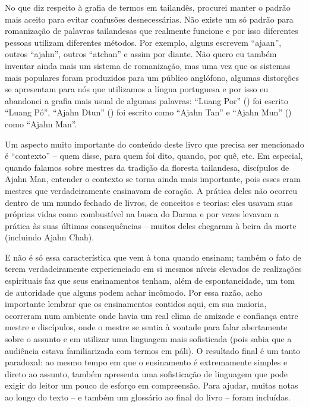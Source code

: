 No que diz respeito à grafia de termos em tailandês, procurei manter
o padrão mais aceito para evitar confusões desnecessárias. Não existe
um só padrão para romanização de palavras tailandesas que realmente
funcione e por isso diferentes pessoas utilizam diferentes métodos. Por
exemplo, alguns escrevem “ajaan”, outros “ajahn”, outros “atchan” e
assim por diante. Não quero eu também inventar ainda mais um sistema de
romanização, mas uma vez que os sistemas mais populares foram
produzidos para um público anglófono, algumas distorções se apresentam
para nós que utilizamos a língua portuguesa e por isso eu abandonei a
grafia mais usual de algumas palavras: “Luang Por” () foi escrito “Luang Pó”, “Ajahn Dtun” ()
foi escrito como “Ajahn Tan” e “Ajahn Mun” ()
como “Ajahn Man”. 

Um aspecto muito importante do conteúdo deste livro que precisa ser
mencionado é “contexto” – quem disse, para quem foi dito, quando, por
quê, etc. Em especial, quando falamos sobre mestres da tradição da
floresta tailandesa, discípulos de Ajahn Man, entender o contexto se
torna ainda mais importante, pois esses eram mestres que
verdadeiramente ensinavam de coração. A prática deles não ocorreu
dentro de um mundo fechado de livros, de conceitos e teorias: eles
usavam suas próprias vidas como combustível na busca do Darma e por
vezes levavam a prática às suas últimas consequências – muitos deles
chegaram à beira da morte (incluindo Ajahn Chah). 

E não é só essa característica que vem à tona quando ensinam; também
o fato de terem verdadeiramente experienciado em si mesmos níveis
elevados de realizações espirituais faz que seus ensinamentos tenham,
além de espontaneidade, um tom de autoridade que alguns podem achar
incômodo. Por essa razão, acho importante lembrar que os ensinamentos
contidos aqui, em sua maioria, ocorreram num ambiente onde havia um
real clima de amizade e confiança entre mestre e discípulos, onde o
mestre se sentia à vontade para falar abertamente sobre o assunto e em
utilizar uma linguagem mais sofisticada (pois sabia que a audiência
estava familiarizada com termos em páli). O resultado final é
um tanto paradoxal: ao mesmo tempo em que o ensinamento é extremamente
simples e direto ao assunto, também apresenta uma sofisticação de
linguagem que pode exigir do leitor um pouco de esforço em compreensão.
Para ajudar, muitas notas ao longo do texto – e também um glossário ao
final do livro – foram incluídas.

